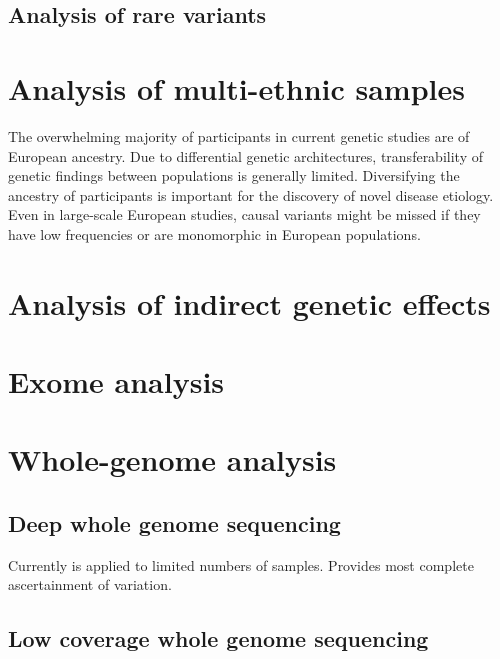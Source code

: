 \documentclass[
]{book}
\begin{document}
\hypertarget{analysis-of-rare-variants-1}{%
\subsection{Analysis of rare variants}\label{analysis-of-rare-variants-1}}

\hypertarget{analysis-of-multi-ethnic-samples}{%
\section{Analysis of multi-ethnic samples}\label{analysis-of-multi-ethnic-samples}}

The overwhelming majority of participants in current genetic studies are of European ancestry. Due to differential genetic architectures, transferability of genetic findings between populations is generally limited. Diversifying the ancestry of participants is important for the discovery of novel disease etiology. Even in large-scale European studies, causal variants might be missed if they have low frequencies or are monomorphic in European populations.

\hypertarget{analysis-of-indirect-genetic-effects}{%
\section{Analysis of indirect genetic effects}\label{analysis-of-indirect-genetic-effects}}

\hypertarget{exome-analysis}{%
\section{Exome analysis}\label{exome-analysis}}

\hypertarget{whole-genome-analysis}{%
\section{Whole-genome analysis}\label{whole-genome-analysis}}

\hypertarget{deep-whole-genome-sequencing}{%
\subsection{Deep whole genome sequencing}\label{deep-whole-genome-sequencing}}

Currently is applied to limited numbers of samples.
Provides most complete ascertainment of variation.

\hypertarget{low-coverage-whole-genome-sequencing}{%
\subsection{Low coverage whole genome sequencing}\label{low-coverage-whole-genome-sequencing}}
\end{document}
